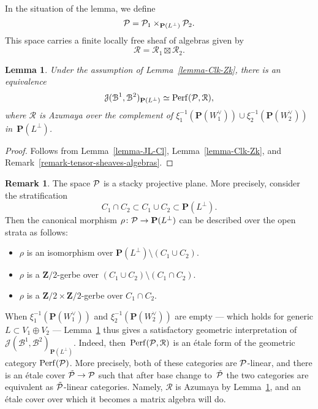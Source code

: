 \documentclass[11pt, reqno]{amsart}
\numberwithin{equation}{section}
\theoremstyle{plain}
\newtheorem{lemma}[theorem]{Lemma}
\theoremstyle{definition}
\newtheorem{remark}[theorem]{Remark}
\newcommand{\Perf}{\mathrm{Perf}}
\newcommand{\svee}{\scriptscriptstyle\vee}
\newcommand{\vW}{W^{\svee}}
\newcommand{\cB}{\mathcal{B}}
\newcommand{\cJ}{\mathcal{J}}
\newcommand{\cR}{\mathcal{R}}
\newcommand{\ccP}{\CMcal{P}}
\newcommand{\bZ}{\mathbf{Z}}
\newcommand{\bP}{\mathbf{P}}
\begin{document}
In the situation of the lemma, we define 
\begin{equation*}
\ccP = \ccP_1 \times_{\bP(L^{\perp})} \ccP_2. 
\end{equation*} 
This space carries a finite locally free sheaf of algebras given by 
\begin{equation*}
\cR =  \cR_1 \boxtimes \cR_2. 
\end{equation*} 

\begin{lemma}
\label{lemma-JL-Z1Z2}
Under the assumption of Lemma~\textup{\ref{lemma-Clk-Zk}}, 
there is an equivalence 
\begin{equation*}
\cJ(\cB^1, \cB^2)_{\bP(L^{\perp})} \simeq \Perf(\ccP, \cR), 
\end{equation*} 
where $\cR$ is Azumaya over 
the complement of $\xi_1^{-1}(\bP(\vW_1)) \cup \xi_2^{-1}(\bP(\vW_2))$ in~$\bP(L^{\perp})$. 
\end{lemma}

\begin{proof}
Follows from Lemma~\ref{lemma-JL-Cl}, Lemma~\ref{lemma-Clk-Zk}, and 
Remark~\ref{remark-tensor-sheaves-algebras}. 
\end{proof}

\begin{remark}
The space $\ccP$ is a stacky projective plane.
More precisely, consider the stratification 
\begin{equation*}
C_1 \cap C_2 \subset C_1 \cup C_2 \subset \bP(L^\perp). 
\end{equation*} 
Then the canonical morphism $\rho \colon \ccP \to \bP(L^{\perp})$ 
can be described over the open strata as follows: 
\begin{itemize}
\item $\rho$ is an isomorphism over $\bP(L^{\perp}) \setminus (C_1 \cup C_2)$. 
\item $\rho$ is a $\bZ/2$-gerbe over $(C_1 \cup C_2) \setminus (C_1 \cap C_2)$. 
\item $\rho$ is a $\bZ/2 \times \bZ/2$-gerbe over $C_1 \cap C_2$. 
\end{itemize} 
When $\xi_1^{-1}(\bP(\vW_1))$ and $\xi_2^{-1}(\bP(\vW_2))$ are empty --- which holds for 
generic $L \subset V_1 \oplus V_2$ --- Lemma~\ref{lemma-JL-Z1Z2} thus gives a satisfactory geometric interpretation 
of $\cJ(\cB^1, \cB^2)_{\bP(L^{\perp})}$. 
Indeed, then~$\Perf(\ccP, \cR)$
is an \'{e}tale form of the 
geometric category $\Perf(\ccP)$.
More precisely, both of these categories are $\ccP$-linear, 
and there is an \'{e}tale cover $\tilde{\ccP} \to \ccP$  
such that after base 
change to~$\tilde{\ccP}$
the two categories are equivalent as $\tilde{\ccP}$-linear categories. 
Namely, $\cR$ 
is Azumaya by Lemma~\ref{lemma-JL-Z1Z2}, and an \'{e}tale 
cover over which it becomes a matrix algebra will do. 
\end{remark}
\end{document}
